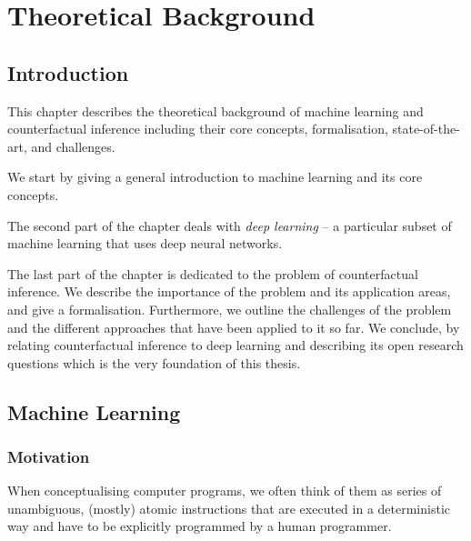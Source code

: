 %

\chapter{\label{ch:2-background}Theoretical Background} 


\section{Introduction}
This chapter describes the theoretical background of machine learning and counterfactual inference including their core concepts, formalisation, state-of-the-art, and challenges. 

We start by giving a general introduction to machine learning and  its core concepts. 

The second part of the chapter deals with  \emph{deep learning} -- a particular subset of machine learning that uses deep neural networks. 

The last part of the chapter is dedicated to the problem of counterfactual inference. We describe the importance of the problem and its application areas, and give a formalisation. Furthermore, we outline the challenges of the problem and the different approaches that have been applied to it so far. We conclude, by relating counterfactual inference to deep learning and describing its open research questions which is the very foundation of this thesis. 



\section{Machine Learning}


\subsection{Motivation}
When conceptualising computer programs, we often think of them as series of unambiguous, (mostly) atomic instructions that are executed in a deterministic way and have to be explicitly programmed by a human programmer. 

